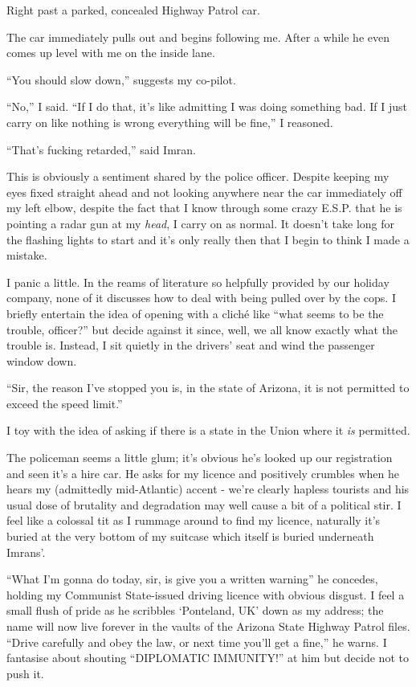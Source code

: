 \documentclass[a5paper,titlepage,draft]{book}
\begin{document}
Right past a parked, concealed Highway Patrol car.

The car immediately pulls out and begins following me.  After a while he even comes up level with me on the inside lane.

``You should slow down,'' suggests my co-pilot.

``No,'' I said.  ``If I do that, it's like admitting I was doing something bad.  If I just carry on like nothing is wrong everything will be fine,'' I reasoned.

``That's fucking retarded,'' said Imran.

This is obviously a sentiment shared by the police officer.  Despite keeping my eyes fixed straight ahead and not looking anywhere near the car immediately off my left elbow, despite the fact that I know through some crazy E.S.P. that he is pointing a radar gun at my \emph{head}, I carry on as normal.  It doesn't take long for the flashing lights to start and it's only really then that I begin to think I made a mistake.

I panic a little.  In the reams of literature so helpfully provided by our holiday company, none of it discusses how to deal with being pulled over by the cops.  I briefly entertain the idea of opening with a clich\'{e} like ``what seems to be the trouble, officer?'' but decide against it since, well, we all know exactly what the trouble is.  Instead, I sit quietly in the drivers' seat and wind the passenger window down.

``Sir, the reason I've stopped you is, in the state of Arizona, it is not permitted to exceed the speed limit.''

I toy with the idea of asking if there is a state in the Union where it \emph{is} permitted.

The policeman seems a little glum; it's obvious he's looked up our registration and seen it's a hire car.  He asks for my licence and positively crumbles when he hears my (admittedly mid-Atlantic) accent - we're clearly hapless tourists and his usual dose of brutality and degradation may well cause a bit of a political stir.  I feel like a colossal tit as I rummage around to find my licence, naturally it's buried at the very bottom of my suitcase which itself is buried underneath Imrans'.

``What I'm gonna do today, sir, is give you a written warning'' he concedes, holding my Communist State-issued driving licence with obvious disgust.  I feel a small flush of pride as he scribbles `Ponteland, UK' down as my address; the name will now live forever in the vaults of the Arizona State Highway Patrol files.  ``Drive carefully and obey the law, or next time you'll get a fine,'' he warns.  I fantasise about shouting ``DIPLOMATIC IMMUNITY!'' at him but decide not to push it.
\end{document}
